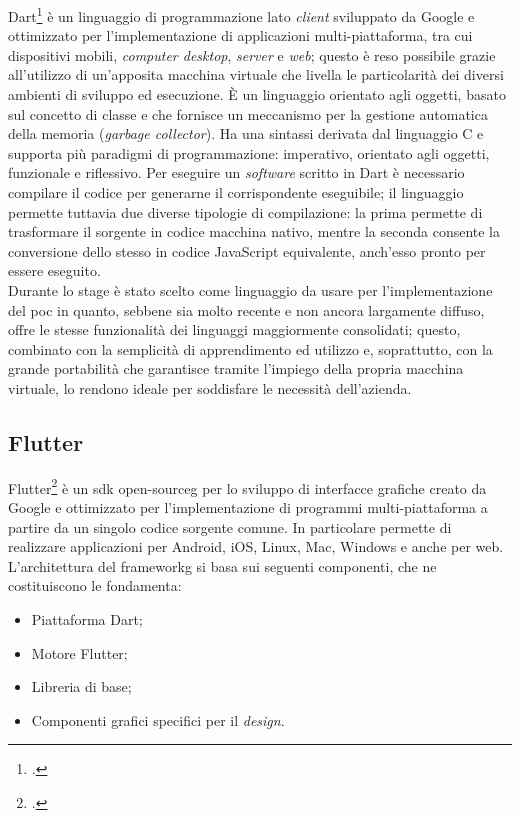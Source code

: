 Dart\footcite{site:dart} è un linguaggio di programmazione lato \textit{client} sviluppato da Google e ottimizzato per l'implementazione di applicazioni multi-piattaforma, tra cui dispositivi mobili, \textit{computer desktop}, \textit{server} e \textit{web}; questo è reso possibile grazie all'utilizzo di un'apposita macchina virtuale che livella le particolarità dei diversi ambienti di sviluppo ed esecuzione. È un linguaggio orientato agli oggetti, basato sul concetto di classe e che fornisce un meccanismo per la gestione automatica della memoria (\textit{garbage collector}). Ha una sintassi derivata dal linguaggio C e supporta più paradigmi di programmazione: imperativo, orientato agli oggetti, funzionale e riflessivo. Per eseguire un \textit{software} scritto in Dart è necessario compilare il codice per generarne il corrispondente eseguibile; il linguaggio permette tuttavia due diverse tipologie di compilazione: la prima permette di trasformare il sorgente in codice macchina nativo, mentre la seconda consente la conversione dello stesso in codice JavaScript equivalente, anch'esso pronto per essere eseguito.\\
Durante lo stage è stato scelto come linguaggio da usare per l'implementazione del \gls{poc} in quanto, sebbene sia molto recente e non ancora largamente diffuso, offre le stesse funzionalità dei linguaggi maggiormente consolidati; questo, combinato con la semplicità di apprendimento ed utilizzo e, soprattutto, con la grande portabilità che garantisce tramite l'impiego della propria macchina virtuale, lo rendono ideale per soddisfare le necessità dell'azienda.

\subsection{Flutter}

Flutter\footcite{site:flutter} è un \gls{sdk}\glsfirstoccur{} \gls{open-sourceg} per lo sviluppo di interfacce grafiche creato da Google e ottimizzato per l'implementazione di programmi multi-piattaforma a partire da un singolo codice sorgente comune. In particolare permette di realizzare applicazioni per Android, iOS, Linux, Mac, Windows e anche per web.\\
L'architettura del \gls{frameworkg}\glsfirstoccur{} si basa sui seguenti componenti, che ne costituiscono le fondamenta:

\begin{itemize}
	\item Piattaforma Dart;
	\item Motore Flutter;
	\item Libreria di base;
	\item Componenti grafici specifici per il \textit{design}.
\end{itemize}

